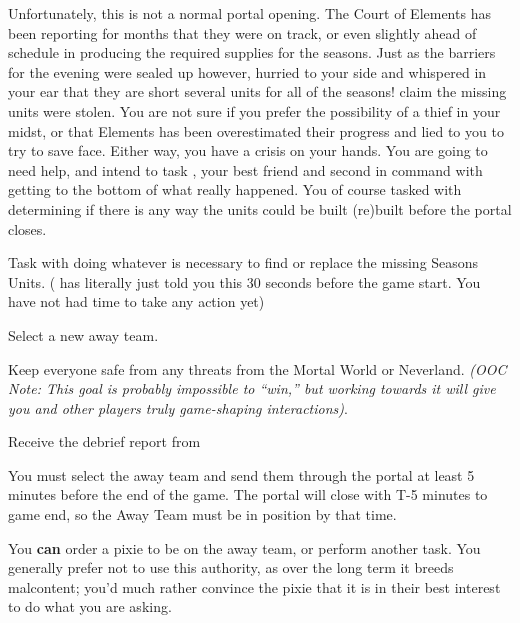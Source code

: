 \documentclass[char]{PP}
\begin{document}
Unfortunately, this is not a normal portal opening. The Court of Elements has been reporting for months that they were on track, or even slightly ahead of schedule in producing the required supplies for the seasons. Just as the barriers for the evening were sealed up however, \cEHead{} hurried to your side and whispered in your ear that they are short several units for all of the seasons! \cEHead{\They} claim\cEHead{\plural} the missing units were stolen. You are not sure if you prefer the possibility of a thief in your midst, or that Elements has been overestimated their progress and lied to you to try to save face. Either way, you have a crisis on your hands. You are going to need help, and intend to task \cSAdvisor{}, your best friend and second in command with getting to the bottom of what really happened. You of course tasked \cEHead{} with determining if there is any way the units could be built (re)built before the portal closes.

\begin{itemz}
	\item Task \cSAdvisor{} with doing whatever is necessary to find or replace the missing Seasons Units. (\cEHead{} has literally just told you this 30 seconds before the game start. You have not had time to take any action yet)
	\item Select a new away team.
	\item Keep everyone safe from any threats from the Mortal World or Neverland. \textit{(OOC Note: This goal is probably impossible to ``win,'' but working towards it will give you and other players truly game-shaping interactions)}.
	\item Receive the debrief report from \cSPM{}
\end{itemz}

\begin{itemz}[Notes]
	\item You must select the away team and send them through the portal at least 5 minutes before the end of the game. The portal will close with T-5 minutes to game end, so the Away Team must be in position by that time.
	\item You \textbf{can} order a pixie to be on the away team, or perform another task. You generally prefer not to use this authority, as over the long term it breeds malcontent; you'd much rather convince the pixie that it is in their best interest to do what you are asking.
\end{itemz}
\end{document}
